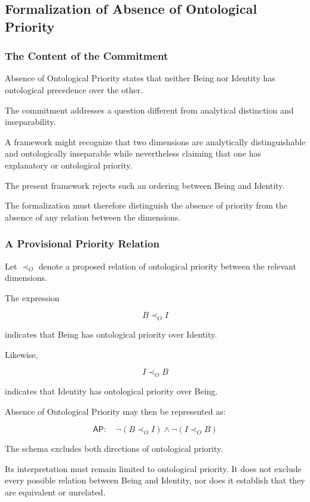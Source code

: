 \subsection{Formalization of Absence of Ontological Priority}

\subsubsection{The Content of the Commitment}

Absence of Ontological Priority states that
neither Being nor Identity has ontological
precedence over the other.

The commitment addresses a question different
from analytical distinction and inseparability.

A framework might recognize that two dimensions
are analytically distinguishable and ontologically
inseparable while nevertheless claiming that
one has explanatory or ontological priority.

The present framework rejects such an ordering
between Being and Identity.

The formalization must therefore distinguish
the absence of priority from the absence of
any relation between the dimensions.

\subsubsection{A Provisional Priority Relation}

Let \(\prec_O\) denote a proposed relation
of ontological priority between the relevant
dimensions.

The expression

\[
B \prec_O I
\]

indicates that Being has ontological priority
over Identity.

Likewise,

\[
I \prec_O B
\]

indicates that Identity has ontological
priority over Being.

Absence of Ontological Priority may then
be represented as:

\[
\mathsf{AP}:
\quad
\neg(B\prec_O I)
\land
\neg(I\prec_O B)
\]

The schema excludes both directions of
ontological priority.

Its interpretation must remain limited
to ontological priority. It does not
exclude every possible relation between
Being and Identity, nor does it establish
that they are equivalent or unrelated.

